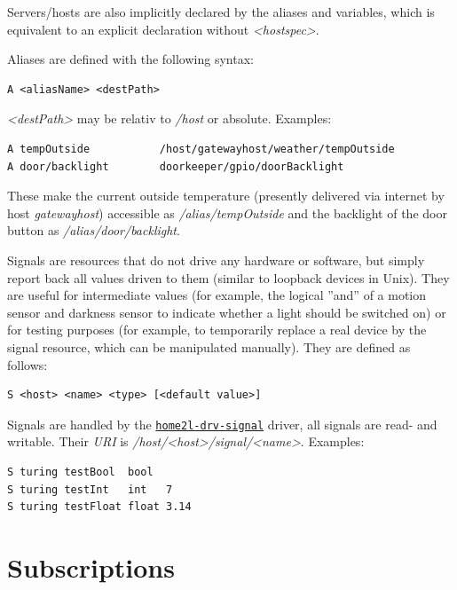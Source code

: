 \documentclass[12pt,english,parskip=half,headheight=19pt]{scrreprt}
\newcommand{\idx}[1]{#1\index{#1}}
\newcommand{\reftool}[1]{\hyperref[tool:#1]{\texttt{\idx{#1}}}}
\begin{document}
Servers/hosts are also implicitly declared by the aliases and variables,
which is equivalent to an explicit declaration without \textit{<hostspec>}.

Aliases are defined with the following syntax:
\begin{lstlisting}
A <aliasName> <destPath>
\end{lstlisting}

\textit{<destPath>} may be relativ to \textit{/host} or absolute.
Examples:
\begin{lstlisting}
A tempOutside           /host/gatewayhost/weather/tempOutside
A door/backlight        doorkeeper/gpio/doorBacklight
\end{lstlisting}

These make the current outside temperature (presently delivered via
internet by host \textit{gatewayhost}) accessible as
\textit{/alias/tempOutside} and the backlight of the door button as
\textit{/alias/door/backlight}.

Signals are resources that do not drive any hardware or software, but
simply report back all values driven to them (similar to loopback
devices in Unix). They are useful for intermediate values (for example,
the logical ''and'' of a motion sensor and darkness sensor to indicate
whether a light should be switched on) or for testing purposes (for
example, to temporarily replace a real device by the signal resource,
which can be manipulated manually). They are defined as follows:
\begin{lstlisting}
S <host> <name> <type> [<default value>]
\end{lstlisting}

Signals are handled by the \reftool{home2l-drv-signal} driver, all signals are
read- and writable. Their \textit{URI} is \textit{/host/<host>/signal/<name>}.
Examples:
\begin{lstlisting}
S turing testBool  bool
S turing testInt   int   7
S turing testFloat float 3.14
\end{lstlisting}





\section{Subscriptions}
\label{sec:resources-subscriptions}
\end{document}
